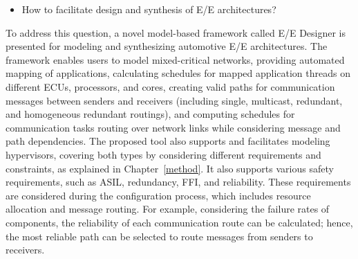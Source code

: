     \begin{itemize}
        \item How to facilitate design and synthesis of E/E architectures?
          \end{itemize}
        To address this question, a novel model-based framework called E/E Designer is presented for modeling and synthesizing automotive E/E architectures. The framework enables users to model mixed-critical networks, providing automated mapping of applications, calculating schedules for mapped application threads on different ECUs, processors, and cores, creating valid paths for communication messages between senders and receivers (including single, multicast, redundant, and homogeneous redundant routings), and computing schedules for communication tasks routing over network links while considering message and path dependencies. The proposed tool also supports and facilitates modeling hypervisors, covering both types by considering different requirements and constraints, as explained in Chapter~\ref{method}.
        It also supports various safety requirements, such as ASIL, redundancy, FFI, and reliability. These requirements are considered during the configuration process, which includes resource allocation and message routing. For example, considering the failure rates of components, the reliability of each communication route can be calculated; hence, the most reliable path can be selected to route messages from senders to receivers.
        

